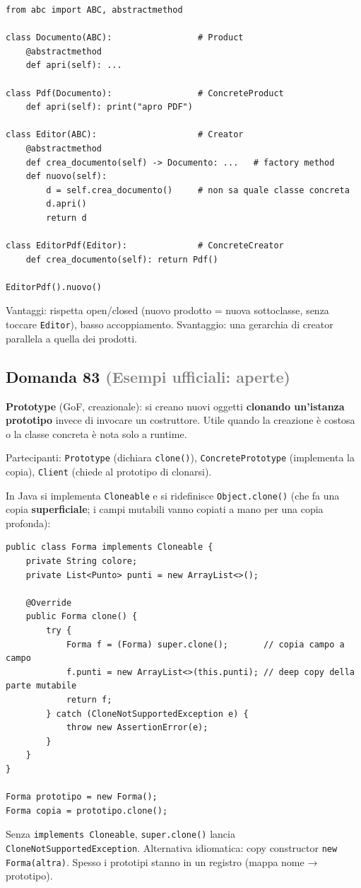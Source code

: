\documentclass[a4paper,11pt]{article}
\begin{document}
\begin{verbatim}
from abc import ABC, abstractmethod

class Documento(ABC):                 # Product
    @abstractmethod
    def apri(self): ...

class Pdf(Documento):                 # ConcreteProduct
    def apri(self): print("apro PDF")

class Editor(ABC):                    # Creator
    @abstractmethod
    def crea_documento(self) -> Documento: ...   # factory method
    def nuovo(self):
        d = self.crea_documento()     # non sa quale classe concreta
        d.apri()
        return d

class EditorPdf(Editor):              # ConcreteCreator
    def crea_documento(self): return Pdf()

EditorPdf().nuovo()
\end{verbatim}
Vantaggi: rispetta open/closed (nuovo prodotto = nuova sottoclasse, senza toccare \texttt{Editor}), basso accoppiamento. Svantaggio: una gerarchia di creator parallela a quella dei prodotti.



\subsection*{Domanda 83 \hfill {\small \textcolor{gray}{(Esempi ufficiali: aperte)}}}
\textbf{Prototype} (GoF, creazionale): si creano nuovi oggetti \textbf{clonando un'istanza prototipo} invece di invocare un costruttore. Utile quando la creazione è costosa o la classe concreta è nota solo a runtime.

Partecipanti: \texttt{Prototype} (dichiara \texttt{clone()}), \texttt{ConcretePrototype} (implementa la copia), \texttt{Client} (chiede al prototipo di clonarsi).

In Java si implementa \texttt{Cloneable} e si ridefinisce \texttt{Object.clone()} (che fa una copia \textbf{superficiale}; i campi mutabili vanno copiati a mano per una copia profonda):

\begin{verbatim}
public class Forma implements Cloneable {
    private String colore;
    private List<Punto> punti = new ArrayList<>();

    @Override
    public Forma clone() {
        try {
            Forma f = (Forma) super.clone();       // copia campo a campo
            f.punti = new ArrayList<>(this.punti); // deep copy della parte mutabile
            return f;
        } catch (CloneNotSupportedException e) {
            throw new AssertionError(e);
        }
    }
}

Forma prototipo = new Forma();
Forma copia = prototipo.clone();
\end{verbatim}
Senza \texttt{implements Cloneable}, \texttt{super.clone()} lancia \texttt{CloneNotSupportedException}. Alternativa idiomatica: copy constructor \texttt{new Forma(altra)}. Spesso i prototipi stanno in un registro (mappa nome → prototipo).
\end{document}
